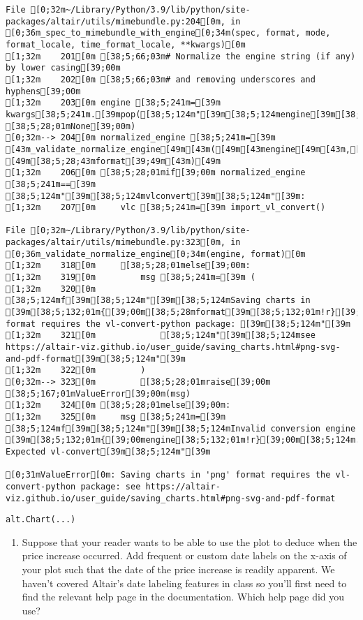 \documentclass[
  letterpaper,
  DIV=11,
  numbers=noendperiod]{scrartcl}
\providecommand{\tightlist}{%
  \setlength{\itemsep}{0pt}\setlength{\parskip}{0pt}}\usepackage{longtable,booktabs,array}
\begin{document}
\begin{verbatim}
File [0;32m~/Library/Python/3.9/lib/python/site-packages/altair/utils/mimebundle.py:204[0m, in [0;36m_spec_to_mimebundle_with_engine[0;34m(spec, format, mode, format_locale, time_format_locale, **kwargs)[0m
[1;32m    201[0m [38;5;66;03m# Normalize the engine string (if any) by lower casing[39;00m
[1;32m    202[0m [38;5;66;03m# and removing underscores and hyphens[39;00m
[1;32m    203[0m engine [38;5;241m=[39m kwargs[38;5;241m.[39mpop([38;5;124m"[39m[38;5;124mengine[39m[38;5;124m"[39m, [38;5;28;01mNone[39;00m)
[0;32m--> 204[0m normalized_engine [38;5;241m=[39m [43m_validate_normalize_engine[49m[43m([49m[43mengine[49m[43m,[49m[43m [49m[38;5;28;43mformat[39;49m[43m)[49m
[1;32m    206[0m [38;5;28;01mif[39;00m normalized_engine [38;5;241m==[39m [38;5;124m"[39m[38;5;124mvlconvert[39m[38;5;124m"[39m:
[1;32m    207[0m     vlc [38;5;241m=[39m import_vl_convert()

File [0;32m~/Library/Python/3.9/lib/python/site-packages/altair/utils/mimebundle.py:323[0m, in [0;36m_validate_normalize_engine[0;34m(engine, format)[0m
[1;32m    318[0m     [38;5;28;01melse[39;00m:
[1;32m    319[0m         msg [38;5;241m=[39m (
[1;32m    320[0m             [38;5;124mf[39m[38;5;124m"[39m[38;5;124mSaving charts in [39m[38;5;132;01m{[39;00m[38;5;28mformat[39m[38;5;132;01m!r}[39;00m[38;5;124m format requires the vl-convert-python package: [39m[38;5;124m"[39m
[1;32m    321[0m             [38;5;124m"[39m[38;5;124msee https://altair-viz.github.io/user_guide/saving_charts.html#png-svg-and-pdf-format[39m[38;5;124m"[39m
[1;32m    322[0m         )
[0;32m--> 323[0m         [38;5;28;01mraise[39;00m [38;5;167;01mValueError[39;00m(msg)
[1;32m    324[0m [38;5;28;01melse[39;00m:
[1;32m    325[0m     msg [38;5;241m=[39m [38;5;124mf[39m[38;5;124m"[39m[38;5;124mInvalid conversion engine [39m[38;5;132;01m{[39;00mengine[38;5;132;01m!r}[39;00m[38;5;124m. Expected vl-convert[39m[38;5;124m"[39m

[0;31mValueError[0m: Saving charts in 'png' format requires the vl-convert-python package: see https://altair-viz.github.io/user_guide/saving_charts.html#png-svg-and-pdf-format
\end{verbatim}

\begin{verbatim}
alt.Chart(...)
\end{verbatim}

\begin{enumerate}
\def\labelenumi{\arabic{enumi}.}
\setcounter{enumi}{1}
\tightlist
\item
  Suppose that your reader wants to be able to use the plot to deduce
  when the price increase occurred. Add frequent or custom date labels
  on the x-axis of your plot such that the date of the price increase is
  readily apparent. We haven't covered Altair's date labeling features
  in class so you'll first need to find the relevant help page in the
  documentation. Which help page did you use?
\end{enumerate}
\end{document}
